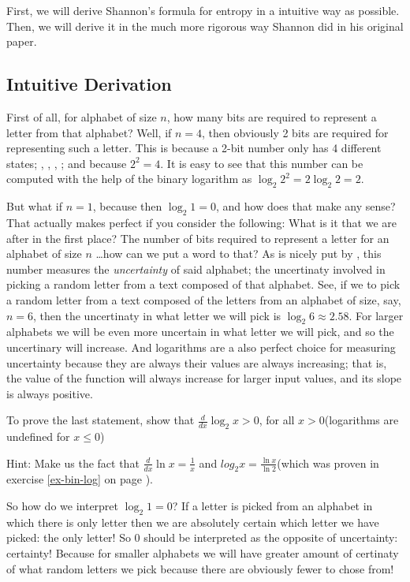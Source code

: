 First, we will derive Shannon's formula for entropy in a intuitive way
as possible. Then, we will derive it in the much more rigorous way
Shannon did in his original paper.

\subsection{Intuitive Derivation}

First of all, for alphabet of size $n$, how many bits are required to
represent a letter from that alphabet? Well, if $n=4$, then obviously
2 bits are required for representing such a letter. This is because a
2-bit number only has 4 different states; , ,
, ; and because $2^2 = 4$. It is easy to see that this
number can be computed with the help of the binary logarithm as
$\log_2 2^2 = 2\log_2 2 = 2$.

But what if $n=1$, because then $\log_2 1 = 0$, and how does that make
any sense? That actually makes perfect if you consider the following:
What is it that we are after in the first place? The number of bits
required to represent a letter for an alphabet of size $n$ \dots how
can we put a word to that? As is nicely put by \cite{schneider2008},
this number measures the \textit{uncertainty} of said alphabet; the
uncertinaty involved in picking a random letter from a text composed
of that alphabet. See, if we to pick a random letter from a text
composed of the letters from an alphabet of size, say, $n=6$, then the
uncertinaty in what letter we will pick is $\log_2 6 \approx
2.58$. For larger alphabets we will be even more uncertain in what
letter we will pick, and so the uncertinary will increase. And
logarithms are a also perfect choice for measuring uncertainty because
they are always their values are always increasing; that is, the value
of the function will always increase for larger input values, and its
slope is always positive.

\begin{Exercise}[label={deriv-log}]
  To prove the last statement, show that $\frac{d}{dx} \log_2 x > 0$,
  for all $x > 0$(logarithms are undefined for $x \le 0$)

  Hint: Make us the fact that $\frac{d}{dx} \ln x = \frac{1}{x}$ and
  $log_2 x = \frac{\ln x}{\ln 2}$(which was proven in exercise
  \ref{ex-bin-log} on page \pageref{ex-bin-log}).
\end{Exercise}

So how do we interpret $\log_2 1 = 0$? If a letter is picked from an
alphabet in which there is only letter then we are absolutely certain
which letter we have picked: the only letter! So $0$ should be
interpreted as the opposite of uncertainty: certainty! Because for
smaller alphabets we will have greater amount of certinaty of what
random letters we pick because there are obviously fewer to chose
from!

